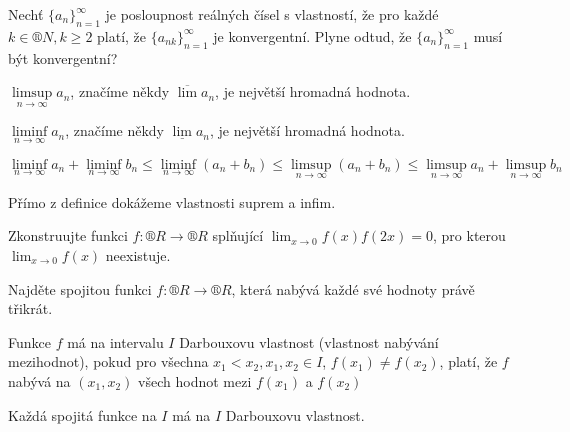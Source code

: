 \documentclass[12pt]{article}					%
\begin{document}
    \begin{priklad}
        Nechť $\{a_n\}_{n = 1}^∞$ je posloupnost reálných čísel s vlastností, že pro každé $k \in ®N, k≥2$ platí, že $\{a_{nk}\}_{n = 1}^∞$ je konvergentní. Plyne odtud, že $\{a_n\}_{n = 1}^∞$ musí být konvergentní?
    \end{priklad}

    \begin{poznamka}[Připomeňme]
        $\limsup\limits_{n \rightarrow ∞} a_n$, značíme někdy $\overline{\lim} a_n$, je největší hromadná hodnota.

        $\liminf\limits_{n \rightarrow ∞} a_n$, značíme někdy $\underline{\lim} a_n$, je největší hromadná hodnota.
    \end{poznamka}

    \begin{tvrzeni}
        $$ \liminf\limits_{n \rightarrow ∞} a_n + \liminf\limits_{n \rightarrow ∞}b_n ≤ \liminf\limits_{n \rightarrow ∞} (a_n + b_n) ≤ \limsup\limits_{n \rightarrow ∞} (a_n + b_n) ≤ \limsup\limits_{n \rightarrow ∞} a_n + \limsup\limits_{n \rightarrow ∞} b_n $$
        \begin{dukazin}
            Přímo z definice dokážeme vlastnosti suprem a infim.
        \end{dukazin}
    \end{tvrzeni}


    \begin{priklad}
            Zkonstruujte funkci $f: ®R \rightarrow ®R$ splňující $\lim_{x \rightarrow 0} f(x)f(2x) = 0$, pro kterou $\lim_{x \rightarrow 0} f(x)$ neexistuje.
    \end{priklad}


    \begin{priklad}
        Najděte spojitou funkci $f: ®R \rightarrow ®R$, která nabývá každé své hodnoty právě třikrát.
    \end{priklad}

    \begin{definice}
        Funkce $f$ má na intervalu $I$ Darbouxovu vlastnost (vlastnost nabývání mezihodnot), pokud pro všechna $x_1 < x_2, x_1, x_2 \in I$, $f(x_1) ≠ f(x_2)$, platí, že $f$ nabývá na $(x_1, x_2)$ všech hodnot mezi $f(x_1)$ a $f(x_2)$
    \end{definice}

    \begin{veta}[Z přednášky]
        Každá spojitá funkce na $I$ má na $I$ Darbouxovu vlastnost.
    \end{veta}
\end{document}
